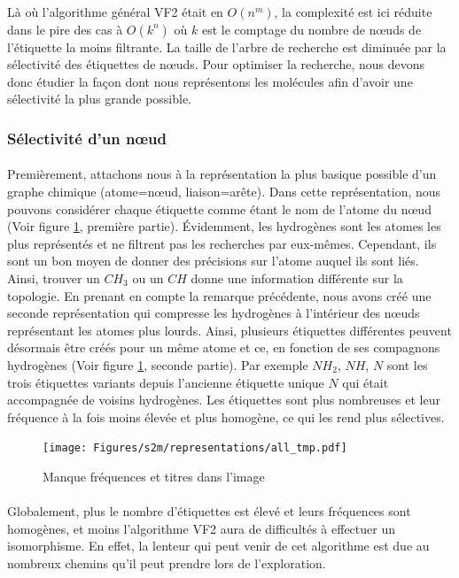 \documentclass[12pt,french,twoside]{report}
\begin{document}
Là où l'algorithme général VF2 était en $O(n^m)$, la complexité est ici réduite dans le pire des cas à $O(k^n)$ où $k$ est le comptage du nombre de n\oe{}uds de l'étiquette la moins filtrante.
La taille de l'arbre de recherche est diminuée par la sélectivité des étiquettes de n\oe{}uds.
Pour optimiser la recherche, nous devons donc étudier la façon dont nous représentons les molécules afin d'avoir une sélectivité
la plus grande possible.

\subsubsection{Sélectivité d'un n\oe{}ud}

\paragraph{}Premièrement, attachons nous à la représentation la plus basique possible d'un graphe chimique (atome=n\oe{}ud,
liaison=arête). Dans cette représentation, nous pouvons considérer chaque étiquette comme étant le nom de l'atome du n\oe{}ud (Voir
figure \ref{representations}, première partie). Évidemment, les hydrogènes sont les atomes les plus représentés et ne filtrent
pas les recherches par eux-mêmes. Cependant, ils sont un bon moyen de donner des précisions sur l'atome auquel ils sont liés.
Ainsi, trouver un $CH_{3}$ ou un $CH$ donne une information différente sur la topologie.
En prenant en compte la remarque précédente, nous avons créé une seconde représentation qui compresse les hydrogènes à l'intérieur
des n\oe{}uds représentant les atomes plus lourds.
Ainsi, plusieurs étiquettes différentes peuvent
désormais être créés pour un même atome et ce, en fonction de ses compagnons hydrogènes (Voir figure \ref{representations},
seconde partie). Par exemple $NH_2$, $NH$, $N$ sont les
trois étiquettes variants depuis l'ancienne étiquette unique $N$ qui était accompagnée de voisins hydrogènes. Les étiquettes sont plus nombreuses et leur fréquence à la fois moins élevée et plus homogène, ce qui les rend plus sélectives.

\begin{figure}[!ht]
  \texttt{[image: Figures/s2m/representations/all\_tmp.pdf]}
  \caption{\label{representations}Manque fréquences et titres dans l'image}
\end{figure}

\paragraph{}Globalement, plus le nombre d'étiquettes est élevé et leurs fréquences sont homogènes, et moins l'algorithme VF2 aura de
difficultés à effectuer un isomorphisme. En effet, la lenteur qui peut venir de cet algorithme est due au nombreux chemins qu'il
peut prendre lors de l'exploration.
\end{document}

